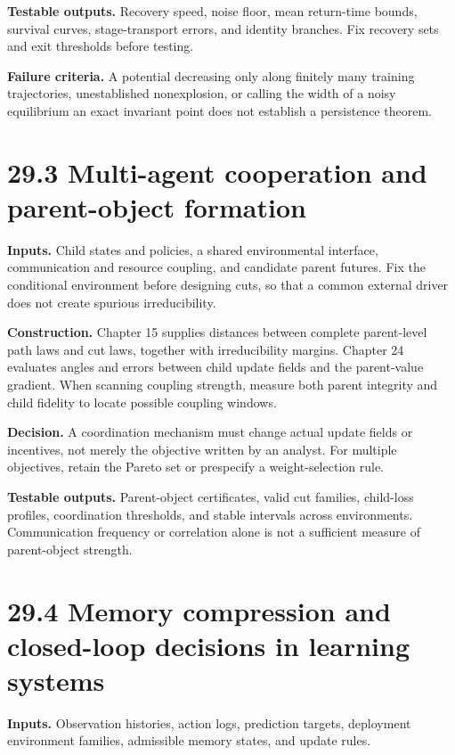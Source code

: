 \documentclass[
  english,
  11pt,
  oneside]{book}
\newcounter{none} %
\begin{document}
\textbf{Testable outputs.} Recovery speed, noise floor, mean return-time bounds, survival curves, stage-transport errors, and identity branches. Fix recovery sets and exit thresholds before testing.

\textbf{Failure criteria.} A potential decreasing only along finitely many training trajectories, unestablished nonexplosion, or calling the width of a noisy equilibrium an exact invariant point does not establish a persistence theorem.

\section{29.3 Multi-agent cooperation and parent-object formation}\label{multi-agent-cooperation-and-parent-object-formation}

\textbf{Inputs.} Child states and policies, a shared environmental interface, communication and resource coupling, and candidate parent futures. Fix the conditional environment before designing cuts, so that a common external driver does not create spurious irreducibility.

\textbf{Construction.} Chapter 15 supplies distances between complete parent-level path laws and cut laws, together with irreducibility margins. Chapter 24 evaluates angles and errors between child update fields and the parent-value gradient. When scanning coupling strength, measure both parent integrity and child fidelity to locate possible coupling windows.

\textbf{Decision.} A coordination mechanism must change actual update fields or incentives, not merely the objective written by an analyst. For multiple objectives, retain the Pareto set or prespecify a weight-selection rule.

\textbf{Testable outputs.} Parent-object certificates, valid cut families, child-loss profiles, coordination thresholds, and stable intervals across environments. Communication frequency or correlation alone is not a sufficient measure of parent-object strength.

\section{29.4 Memory compression and closed-loop decisions in learning systems}\label{memory-compression-and-closed-loop-decisions-in-learning-systems}

\textbf{Inputs.} Observation histories, action logs, prediction targets, deployment environment families, admissible memory states, and update rules.
\end{document}
